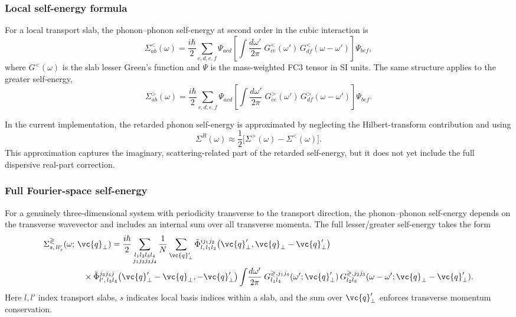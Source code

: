 \subsubsection{Local self-energy formula}

For a local transport slab, the phonon--phonon self-energy at second
order in the cubic interaction is
\begin{equation}\label{eq:sigma_guo}
  \Sigma^{<}_{ab}(\omega)
  = \frac{i\hbar}{2}
    \sum_{c,d,e,f}
    \Psi_{acd}
    \left[
      \int \frac{d\omega'}{2\pi}\;
      G^<_{ce}(\omega')\,
      G^<_{df}(\omega-\omega')
    \right]
    \Psi_{bef},
\end{equation}
where $G^<(\omega)$ is the slab lesser Green's function and
$\Psi$ is the mass-weighted FC3 tensor in SI units.  The same structure
applies to the greater self-energy,
\begin{equation}
  \Sigma^{>}_{ab}(\omega)
  = \frac{i\hbar}{2}
    \sum_{c,d,e,f}
    \Psi_{acd}
    \left[
      \int \frac{d\omega'}{2\pi}\;
      G^>_{ce}(\omega')\,
      G^>_{df}(\omega-\omega')
    \right]
    \Psi_{bef}.
\end{equation}

In the current implementation, the retarded phonon self-energy is
approximated by neglecting the Hilbert-transform contribution and using
\begin{equation}\label{eq:sigma_r}
  \Sigma^R(\omega)
  \approx \frac{1}{2}
  \bigl[\Sigma^>(\omega) - \Sigma^<(\omega)\bigr].
\end{equation}
This approximation captures the imaginary, scattering-related part of
the retarded self-energy, but it does not yet include the full
dispersive real-part correction.

\subsubsection{Full Fourier-space self-energy}

For a genuinely three-dimensional system with periodicity transverse to
the transport direction, the phonon--phonon self-energy depends on the
transverse wavevector and includes an internal sum over all transverse
momenta.  The full lesser/greater self-energy takes the form
\begin{align}\label{eq:sigma_phph}
  \Sigma^{\gtrless}_{s,\,ll'_s}(&\omega;\,\vc{q}_\perp)
  = \frac{i\hbar}{2}
    \sum_{\substack{l_1 l_2 l_3 l_4\\ j_1 j_2 j_3 j_4}}
    \frac{1}{N}\sum_{\vc{q}'_\perp}
    \tilde{\Phi}^{ij_1j_2}_{l,\,l_1 l_2}
      \!\left(\vc{q}'_\perp,\vc{q}_\perp-\vc{q}'_\perp\right)
    \notag\\
  &\qquad\times
    \tilde{\Phi}^{j_3j_4j}_{l',\,l_3 l_4}
      \!\left(\vc{q}'_\perp-\vc{q}_\perp,-\vc{q}'_\perp\right)
    \int\!\frac{d\omega'}{2\pi}\;
    G^{\gtrless,j_1j_4}_{l_1l_4}(\omega';\vc{q}'_\perp)\,
    G^{\gtrless,j_2j_3}_{l_2l_3}
      (\omega-\omega';\vc{q}_\perp-\vc{q}'_\perp).
\end{align}
Here $l,l'$ index transport slabs, $s$ indicates local basis indices
within a slab, and the sum over $\vc{q}'_\perp$ enforces transverse
momentum conservation.

